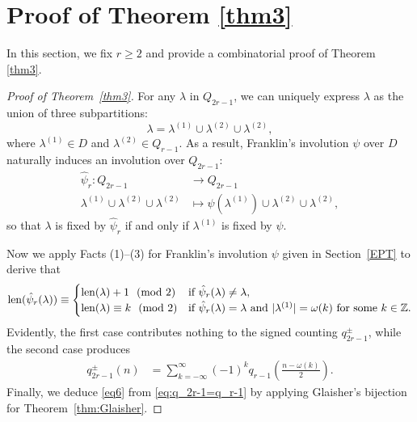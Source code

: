 \documentclass[12pt,reqno]{amsart}
\numberwithin{equation}{section}
\newcommand{\len}{\mathrm{len}}
\def\bZ{\mathbb{Z}}
\newcommand{\tpmod}[1]{\mkern 12mu(\textup{mod}\mkern 6mu #1)}
\begin{document}
\section{Proof of Theorem \ref{thm3} \label{Po3}}
In this section, we fix $r\geq 2$ and provide a combinatorial proof of Theorem \ref{thm3}. 
\begin{proof}[Proof of Theorem~\ref{thm3}]
	For any $\lambda$ in $Q_{2r-1}$, we can uniquely express $\lambda$ as the union of three subpartitions: 
	\begin{equation*}
		\lambda = \lambda^{(1)} \cup \lambda^{(2)}\cup\lambda^{(2)},
	\end{equation*}
	where $\lambda^{(1)}\in D$ and $\lambda^{(2)}\in Q_{r-1}$. As a result, Franklin's involution $\psi$ over $D$ naturally induces an involution over $Q_{2r-1}$:
	\begin{align*}
	\hat{\psi}_r: Q_{2r-1} &\to Q_{2r-1} \\
	\lambda^{(1)} \cup \lambda^{(2)}\cup\lambda^{(2)} &\mapsto \psi(\lambda^{(1)}) \cup \lambda^{(2)}\cup\lambda^{(2)},
	\end{align*}
	so that $\lambda$ is fixed by $\hat{\psi}_r$ if and only if $\lambda^{(1)}$ is fixed by $\psi$.

Now we apply Facts (1)--(3) for Franklin's involution $\psi$ given in Section~\ref{EPT} to derive that
\begin{align*}
\len(\hat{\psi}_r(\lambda)) \equiv \begin{cases}
\len(\lambda)+1 \tpmod 2 & \text{if $\hat{\psi}_r(\lambda)\neq \lambda$,} \\
\len(\lambda)\equiv k \tpmod 2 & \text{if $\hat{\psi}_r(\lambda)= \lambda$ and $|\lambda^{(1)}|=\omega(k)$ for some $k\in \bZ$.}
\end{cases}
\end{align*}
Evidently, the first case contributes nothing to the signed counting $q_{2r-1}^{\pm}$, while the second case produces
\begin{align}
q^{\pm}_{2r-1}(n) &= \sum_{k=-\infty}^{\infty}(-1)^k q_{r-1}(\frac{n-\omega(k)}{2}).\label{eq:q_2r-1=q_r-1}
\end{align}
Finally, we deduce \eqref{eq6} from \eqref{eq:q_2r-1=q_r-1} by applying Glaisher's bijection for Theorem~\ref{thm:Glaisher}.

	
	
	
	
	
	
	
	
	
	
	
	

\end{proof}
\end{document}
